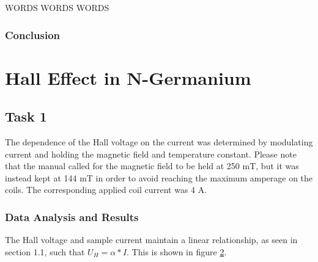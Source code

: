 \documentclass[a4paper]{article}
\begin{document}
\begin{figure}[H]
\centering
\label{task25plot}
\end{figure}

WORDS WORDS WORDS


\subsubsection{Conclusion}

\section{Hall Effect in N-Germanium}

\subsection{Task 1}

\qq The dependence of the Hall voltage on the current was determined 
by modulating current and holding the magnetic field and temperature 
constant. Please note that the manual called for the magnetic field to 
be held at 250 mT, but it was instead kept at 144 mT in order to 
avoid reaching the maximum amperage on the coils. The corresponding
applied coil current was 4 A.

\subsubsection{Data Analysis and Results}
The Hall voltage and sample current maintain a linear relationship, as seen in section 1.1, such that $U_H = \alpha * I$. This is shown in figure \ref{task31plot}.

\begin{figure}[H]
\centering
\label{task31plot}
\end{figure}
\end{document}
